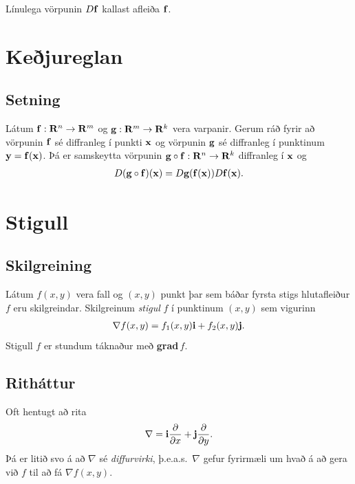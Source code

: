 \documentclass[a4paper,10pt,icelandic]{sphinxmanual}
\begin{document}
Línulega vörpunin \(D\mbox{${\bf f}$}\) kallast afleiða
\(\mbox{${\bf f}$}\).


\section{Keðjureglan}
\label{Kafli2:kejureglan}

\subsection{Setning}
\label{Kafli2:id38}
Látum
\(\mbox{${\bf f}$}:\mbox{${\bf R}^n$}\rightarrow \mbox{${\bf R}^m$}\)
og
\(\mbox{${\bf g}$}:\mbox{${\bf R}^m$}\rightarrow \mbox{${\bf R}^k$}\)
vera varpanir. Gerum ráð fyrir að vörpunin \(\mbox{${\bf f}$}\) sé
diffranleg í punkti \(\mbox{${\bf x}$}\) og vörpunin
\(\mbox{${\bf g}$}\) sé diffranleg í punktinum
\(\mbox{${\bf y}$}=\mbox{${\bf f}$}(\mbox{${\bf x}$})\). Þá er
samskeytta vörpunin
\(\mbox{${\bf g}$}\circ\mbox{${\bf f}$}:\mbox{${\bf R}^n$}\rightarrow\mbox{${\bf R}^k$}\)
diffranleg í \(\mbox{${\bf x}$}\) og
\begin{gather}
\begin{split}\displaystyle D(\mbox{${\bf g}$}\circ\mbox{${\bf f}$})(\mbox{${\bf x}$})=D\mbox{${\bf g}$}(\mbox{${\bf f}$}(\mbox{${\bf x}$}))D\mbox{${\bf f}$}(\mbox{${\bf x}$}).\end{split}\notag
\end{gather}

\section{Stigull}
\label{Kafli2:stigull}\label{Kafli2:index-21}

\subsection{Skilgreining}
\label{Kafli2:id39}
Látum \(f(x,y)\) vera fall og \((x,y)\) punkt þar sem báðar
fyrsta stigs hlutafleiður \(f\) eru skilgreindar. Skilgreinum
\emph{stigul} \(f\) í punktinum \((x,y)\) sem vigurinn
\begin{gather}
\begin{split}\displaystyle \nabla f(x,y)=f_1(x,y)\mbox{${\bf i}$}+f_2(x,y)\mbox{${\bf j}$}.\end{split}\notag
\end{gather}
Stigull \(f\) er stundum táknaður með \textbf{grad}\(\,f\).


\subsection{Ritháttur}
\label{Kafli2:id40}
Oft hentugt að rita
\begin{gather}
\begin{split}\displaystyle \nabla=\mbox{${\bf i}$}\frac{\partial}{\partial x}+ \mbox{${\bf j}$}\frac{\partial}{\partial y}.\end{split}\notag
\end{gather}
Þá er litið svo á að \(\nabla\) sé \emph{diffurvirki},
þ.e.a.s. \(\nabla\) gefur fyrirmæli um hvað á að gera við
\(f\) til að fá \(\nabla f(x,y)\).
\end{document}
